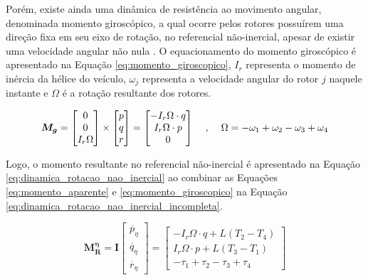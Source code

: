 \documentclass[main.tex]{subfiles}
\begin{document}
Porém, existe ainda uma dinâmica de resistência ao movimento angular, denominada momento giroscópico, a qual ocorre pelos rotores possuírem uma direção fixa em seu eixo de rotação, no referencial não-inercial, apesar de existir uma velocidade angular não nula \cite{hibbeler2011engineering}. O equacionamento do momento giroscópico é apresentado na Equação \ref{eq:momento_giroscopico}, $I_r$ representa o momento de inércia da hélice do veículo, $\omega_j$ representa a velocidade angular do rotor $j$ naquele instante e $\Omega$ é a rotação resultante dos rotores.

\begin{equation}\label{eq:momento_giroscopico}
	\boldsymbol{M_g} = \begin{bmatrix}
		0\\
		0\\
		I_r\Omega
	\end{bmatrix} \times \begin{bmatrix}
		p\\
		q\\
		r
	\end{bmatrix} = \begin{bmatrix}
		- I_r\Omega\cdot q\\
		I_r\Omega\cdot p\\
		0
	\end{bmatrix} \hspace{0.4cm} , \hspace{0.4cm} \Omega = -\omega_1 + \omega_2 - \omega_3 + \omega_4
\end{equation}

 Logo, o momento resultante no referencial não-inercial é apresentado na Equação \ref{eq:dinamica_rotacao_nao_inercial} ao combinar as Equações \ref{eq:momento_aparente} e \ref{eq:momento_giroscopico} na Equação \ref{eq:dinamica_rotacao_nao_inercial_incompleta}.

\begin{equation}\label{eq:dinamica_rotacao_nao_inercial}
	\boldsymbol{M^\eta_R} = \boldsymbol{I} \begin{bmatrix}
		\dot{p_\eta}\\
		\dot{q_\eta}\\
		\dot{r_\eta}
	\end{bmatrix} = \begin{bmatrix}
	- I_r\Omega\cdot q + L(T_2 - T_4)\\
	I_r\Omega\cdot p + L(T_3 - T_1)\\
	-\tau_1 + \tau_2 - \tau_3 + \tau_4
	\end{bmatrix}
\end{equation}
\end{document}

